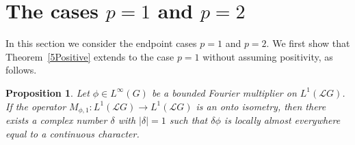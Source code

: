 \documentclass[12pt]{amsart}
\newtheorem{proposition}[theorem]{Proposition}
\theoremstyle{remark}
\theoremstyle{definition}
\numberwithin{equation}{section}
\begin{document}
\medskip
\section{The cases $p=1$ and $p=2$}\label{6}
In this section we consider the endpoint cases $p=1$ and $p=2$. We first show that Theorem~\ref{5Positive} extends to the case $p=1$ without assuming positivity, as follows.

\begin{proposition}\label{6p1}
Let $\phi\in L^\infty(G)$ be a bounded Fourier multiplier on $L^1({\mathcal L}G)$. 
If the operator 
$M_{\phi,1}\colon L^1({\mathcal L}G)\to L^1({\mathcal L}G)$
is an onto isometry, then there exists a complex number $\delta$ with $\vert\delta\vert =1$ 
such that $\delta\phi$ is locally almost everywhere equal to a continuous 
character.
\end{proposition}
\end{document}
